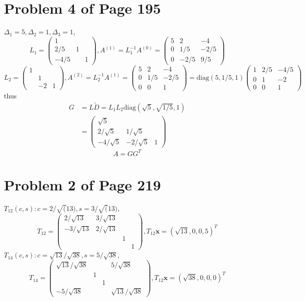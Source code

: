 \documentclass[12pt,a4paper]{article}
\newcommand{\mysection}[2]{
\section{Problem #1 of Page #2}	
	}
\begin{document}
\mysection{4}{195}
$\Delta_1 = 5, \Delta_2 = 1, \Delta_3 =  1$,
\[
	L_1 = \left(\begin{array}{ccc}
	 1 & & \\
	 2/5 & 1 & \\
	 -4/5 & & 1 	
	\end{array} \right),
	A^{(1)} = L_1^{-1} A^{(0)} = \left(\begin{array}{ccc}
	5 & 2 & -4 \\
	0 & 1/5 & -2/5\\
	0 & -2/5& 9/5 	
	\end{array} \right)
\]
\[
	L_2 = \left(\begin{array}{ccc}
	1 & & \\
     & 1 & \\
	  &-2 & 1 	
	\end{array} \right),
	A^{(2)} = L_2^{-1} A^{(1)} = \left(\begin{array}{ccc}
	5 & 2 & -4 \\
	0 & 1/5 & -2/5\\
	0 & 0 & 1 	
	\end{array} \right)	
	= \text{diag}(5,1/5,1) \left(\begin{array}{ccc}
	1 & 2/5 & -4/5 \\
	0 & 1 & -2\\
	0 & 0 & 1 	
	\end{array} \right)	
\]
thus 
\[ \begin{split} 
	G &= L\tilde{D} = L_1L_2 \text{diag}(\sqrt{5}, \sqrt{1/5},1) \\
	&= \left(\begin{array}{ccc}
	\sqrt{5} &  &  \\
	2/\sqrt{5} & 1/\sqrt{5} & \\
	-4/\sqrt{5} & -2/\sqrt{5} & 1 	
	\end{array} \right)	
	\end{split} 
\]
\[
	A = GG^T
\]
\mysection{2}{219}
$T_{12}(c,s): c= 2/\sqrt(13), s = 3/\sqrt(13)$,
\[
	T_{12} = \left(\begin{array}{cccc}
		2/\sqrt{13} & 3/\sqrt{13} &  & \\
		-3/\sqrt{13} & 2/\sqrt{13} & & \\
		 &  & 1 & \\
		 & & & 1 
	\end{array} 	\right),
	T_{12}\bm{x} =  (\sqrt{13}, 0,0,5)^T
\]
$T_14(c,s) : c= \sqrt{13}/\sqrt{38}, s = 5/\sqrt{38}$,
\[
	T_{14} = \left(\begin{array}{cccc}
	\sqrt{13}/\sqrt{38} &   &  &5/\sqrt{38} \\
	  & 1 & & \\
	&  & 1 & \\
	-5/\sqrt{38}& & & \sqrt{13}/\sqrt{38}
	\end{array} 	\right),
	T_{12}\bm{x} =  (\sqrt{38}, 0,0,0)^T	
\]
\end{document}
